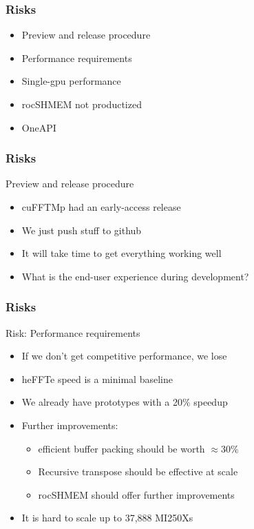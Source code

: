 \documentclass[10pt,aspectratio=169]{beamer}
\begin{document}
\begin{frame}
  \frametitle{Risks}

  \begin{itemize}
  \item Preview and release procedure
  \item Performance requirements
  \item Single-gpu performance
  \item rocSHMEM not productized
  \item OneAPI
  \end{itemize}

\end{frame}

\begin{frame}
  \frametitle{Risks}

  \begin{center}
    Preview and release procedure
  \end{center}
  \begin{itemize}
  \item cuFFTMp had an early-access release
  \item We just push stuff to github
  \item It will take time to get everything working well
  \item What is the end-user experience during development?
  \end{itemize}

\end{frame}

\begin{frame}
  \frametitle{Risks}

  \begin{center}
    Risk: Performance requirements
  \end{center}
  \begin{itemize}
  \item If we don't get competitive performance, we lose
  \item heFFTe speed is a minimal baseline
  \item We already have prototypes with a 20\% speedup
  \item Further improvements:
    \begin{itemize}
    \item efficient buffer packing should be worth $\approx{}30\%$
    \item Recursive transpose should be effective at scale
    \item rocSHMEM should offer further improvements
    \end{itemize}
  \item It is hard to scale up to 37,888 MI250Xs
  \end{itemize}

\end{frame}
\end{document}

